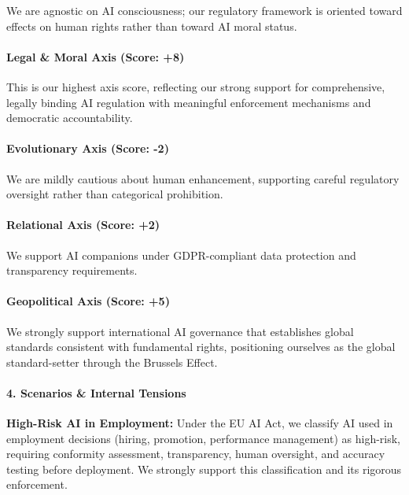 We are agnostic on AI consciousness; our regulatory framework is
oriented toward effects on human rights rather than toward AI moral
status.

\paragraph{Legal \& Moral Axis (Score:
+8)}\label{legal-moral-axis-score-8-1}

This is our highest axis score, reflecting our strong support for
comprehensive, legally binding AI regulation with meaningful enforcement
mechanisms and democratic accountability.

\paragraph{Evolutionary Axis (Score:
-2)}\label{evolutionary-axis-score--2}

We are mildly cautious about human enhancement, supporting careful
regulatory oversight rather than categorical prohibition.

\paragraph{Relational Axis (Score: +2)}\label{relational-axis-score-2-1}

We support AI companions under GDPR-compliant data protection and
transparency requirements.

\paragraph{Geopolitical Axis (Score:
+5)}\label{geopolitical-axis-score-5-1}

We strongly support international AI governance that establishes global
standards consistent with fundamental rights, positioning ourselves as
the global standard-setter through the Brussels Effect.

\paragraph{4. Scenarios \& Internal
Tensions}\label{scenarios-internal-tensions-9}

\textbf{High-Risk AI in Employment:} Under the EU AI Act, we classify AI
used in employment decisions (hiring, promotion, performance management)
as high-risk, requiring conformity assessment, transparency, human
oversight, and accuracy testing before deployment. We strongly support
this classification and its rigorous enforcement.

